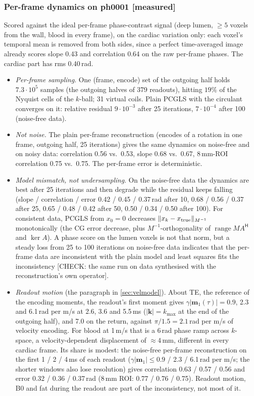 \documentclass[11pt]{article}
\theoremstyle{remark}
\newcommand{\kk}{\bm k}
\newcommand{\herm}{\mathsf H}
\begin{document}
\subsubsection*{Per-frame dynamics on ph0001 [measured]}
Scored against the ideal per-frame phase-contrast signal (deep lumen, $\ge5$ voxels from the wall, blood in every frame), on the cardiac variation only: each voxel's temporal mean is removed from both sides, since a perfect time-averaged image already scores slope 0.43 and correlation 0.64 on the raw per-frame phases. The cardiac part has rms 0.40\,rad.
\begin{itemize}
  \item \emph{Per-frame sampling.} One (frame, encode) set of the outgoing half holds $7.3\cdot10^5$ samples (the outgoing halves of 379 readouts), hitting $19\%$ of the Nyquist cells of the $k$-ball; 31 virtual coils. Plain PCGLS with the circulant converges on it: relative residual $9\cdot10^{-3}$ after 25 iterations, $7\cdot10^{-4}$ after 100 (noise-free data).
  \item \emph{Not noise.} The plain per-frame reconstruction (encodes of a rotation in one frame, outgoing half, 25 iterations) gives the same dynamics on noise-free and on noisy data: correlation 0.56 vs.\ 0.53, slope 0.68 vs.\ 0.67, 8\,mm-ROI correlation 0.75 vs.\ 0.75. The per-frame error is deterministic.
  \item \emph{Model mismatch, not undersampling.} On the noise-free data the dynamics are best after 25 iterations and then degrade while the residual keeps falling (slope / correlation / error 0.42 / 0.45 / 0.37\,rad after 10, 0.68 / 0.56 / 0.37 after 25, 0.65 / 0.48 / 0.42 after 50, 0.50 / 0.34 / 0.50 after 100). For consistent data, PCGLS from $x_0=0$ decreases $\|x_k-x_{\rm true}\|_{M^{-1}}$ monotonically (the CG error decrease, plus $M^{-1}$-orthogonality of $\operatorname{range}MA^\herm$ and $\ker A$). A phase score on the lumen voxels is not that norm, but a steady loss from 25 to 100 iterations on noise-free data indicates that the per-frame data are inconsistent with the plain model and least squares fits the inconsistency [CHECK: the same run on data synthesised with the reconstruction's own operator].
  \item \emph{Readout motion} (the paragraph in \cref{sec:velmodel}). About TE, the reference of the encoding moments, the readout's first moment gives $\gamma|\bm m_1(\tau)|=0.9$, 2.3 and 6.1\,rad per m/s at 2.6, 3.6 and 5.5\,ms ($|\kk|=k_{\max}$ at the end of the outgoing half), and 7.0 on the return, against $\pi/1.5=2.1$\,rad per m/s of velocity encoding. For blood at 1\,m/s that is a 6\,rad phase ramp across $k$-space, a velocity-dependent displacement of $\approx4$\,mm, different in every cardiac frame. Its share is modest: the noise-free per-frame reconstruction on the first 1 / 2 / 4\,ms of each readout ($\gamma|\bm m_1|\le0.9$ / 2.3 / 6.1\,rad per m/s; the shorter windows also lose resolution) gives correlation 0.63 / 0.57 / 0.56 and error 0.32 / 0.36 / 0.37\,rad (8\,mm ROI: 0.77 / 0.76 / 0.75). Readout motion, B0 and fat during the readout are part of the inconsistency, not most of it.

\end{itemize}
\end{document}
